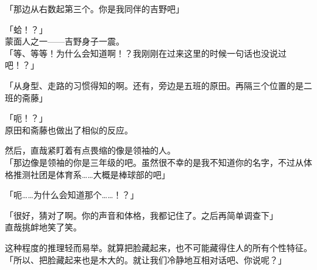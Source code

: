 「那边从右数起第三个。你是我同伴的吉野吧」

「蛤！？」\\

蒙面人之一——吉野身子一震。\\

「等、等等！为什么会知道啊！？我刚刚在过来这里的时候一句话也没说过吧！？」

「从身型、走路的习惯得知的啊。还有，旁边是五班的原田。再隔三个位置的是二班的斋藤」

「呃！？」\\

原田和斋藤也做出了相似的反应。

然后，直哉紧盯着有点畏缩的像是领袖的人。\\

「那边像是领袖的你是三年级的吧。虽然很不幸的是我不知道你的名字，不过从体格推测社团是体育系……大概是棒球部的吧」

「呃……为什么会知道那个……！？」

「很好，猜对了啊。你的声音和体格，我都记住了。之后再简单调查下」\\

直哉挑衅地笑了笑。

这种程度的推理轻而易举。就算把脸藏起来，也不可能藏得住人的所有个性特征。\\

「所以、把脸藏起来也是木大的。就让我们冷静地互相对话吧、你说呢？」\\

